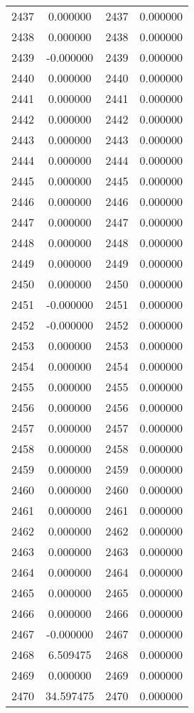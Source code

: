 \documentclass[12pt]{article}
\begin{document}
\begin{longtable}{@{}cccc@{}}
2437 & 0.000000 & 2437 & 0.000000 \\
2438 & 0.000000 & 2438 & 0.000000 \\
2439 & -0.000000 & 2439 & 0.000000 \\
2440 & 0.000000 & 2440 & 0.000000 \\
2441 & 0.000000 & 2441 & 0.000000 \\
2442 & 0.000000 & 2442 & 0.000000 \\
2443 & 0.000000 & 2443 & 0.000000 \\
2444 & 0.000000 & 2444 & 0.000000 \\
2445 & 0.000000 & 2445 & 0.000000 \\
2446 & 0.000000 & 2446 & 0.000000 \\
2447 & 0.000000 & 2447 & 0.000000 \\
2448 & 0.000000 & 2448 & 0.000000 \\
2449 & 0.000000 & 2449 & 0.000000 \\
2450 & 0.000000 & 2450 & 0.000000 \\
2451 & -0.000000 & 2451 & 0.000000 \\
2452 & -0.000000 & 2452 & 0.000000 \\
2453 & 0.000000 & 2453 & 0.000000 \\
2454 & 0.000000 & 2454 & 0.000000 \\
2455 & 0.000000 & 2455 & 0.000000 \\
2456 & 0.000000 & 2456 & 0.000000 \\
2457 & 0.000000 & 2457 & 0.000000 \\
2458 & 0.000000 & 2458 & 0.000000 \\
2459 & 0.000000 & 2459 & 0.000000 \\
2460 & 0.000000 & 2460 & 0.000000 \\
2461 & 0.000000 & 2461 & 0.000000 \\
2462 & 0.000000 & 2462 & 0.000000 \\
2463 & 0.000000 & 2463 & 0.000000 \\
2464 & 0.000000 & 2464 & 0.000000 \\
2465 & 0.000000 & 2465 & 0.000000 \\
2466 & 0.000000 & 2466 & 0.000000 \\
2467 & -0.000000 & 2467 & 0.000000 \\
2468 & 6.509475 & 2468 & 0.000000 \\
2469 & 0.000000 & 2469 & 0.000000 \\
2470 & 34.597475 & 2470 & 0.000000 \\

\end{longtable}
\end{document}
